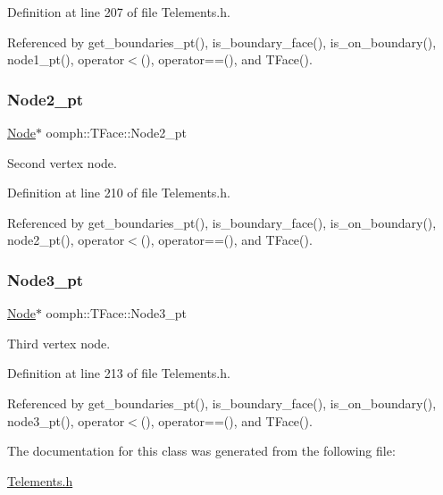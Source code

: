 Definition at line 207 of file Telements.\+h.



Referenced by get\+\_\+boundaries\+\_\+pt(), is\+\_\+boundary\+\_\+face(), is\+\_\+on\+\_\+boundary(), node1\+\_\+pt(), operator$<$(), operator==(), and T\+Face().

\mbox{\label{classoomph_1_1TFace_a1b04ddf3bdd8e1a0b6c469450d598070}} 
\subsubsection{\texorpdfstring{Node2\+\_\+pt}{Node2\_pt}}
{\footnotesize\ttfamily \hyperlink{classoomph_1_1Node}{Node}$\ast$ oomph\+::\+T\+Face\+::\+Node2\+\_\+pt\hspace{0.3cm}{\ttfamily [private]}}



Second vertex node. 



Definition at line 210 of file Telements.\+h.



Referenced by get\+\_\+boundaries\+\_\+pt(), is\+\_\+boundary\+\_\+face(), is\+\_\+on\+\_\+boundary(), node2\+\_\+pt(), operator$<$(), operator==(), and T\+Face().

\mbox{\label{classoomph_1_1TFace_a5cda3e55b6d46d3b6b08b7bf91591b4d}} 
\subsubsection{\texorpdfstring{Node3\+\_\+pt}{Node3\_pt}}
{\footnotesize\ttfamily \hyperlink{classoomph_1_1Node}{Node}$\ast$ oomph\+::\+T\+Face\+::\+Node3\+\_\+pt\hspace{0.3cm}{\ttfamily [private]}}



Third vertex node. 



Definition at line 213 of file Telements.\+h.



Referenced by get\+\_\+boundaries\+\_\+pt(), is\+\_\+boundary\+\_\+face(), is\+\_\+on\+\_\+boundary(), node3\+\_\+pt(), operator$<$(), operator==(), and T\+Face().



The documentation for this class was generated from the following file\+:\begin{DoxyCompactItemize}
\item 
\hyperlink{Telements_8h}{Telements.\+h}\end{DoxyCompactItemize}
